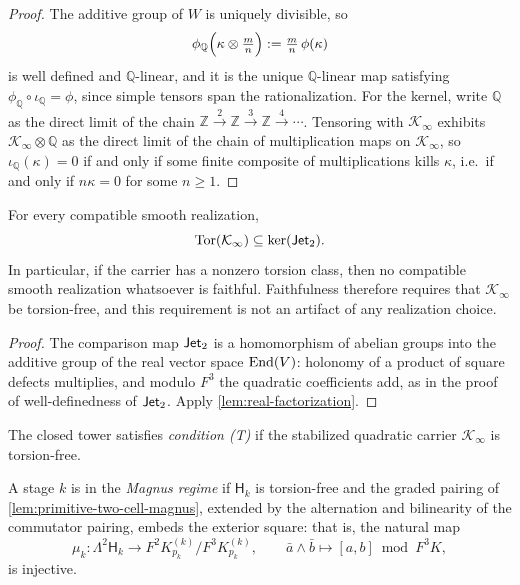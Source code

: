 \begin{proof}
	The additive group of \(W\) is uniquely divisible, so
	\[
		\phi_{\mathbb Q}\Bigl(\kappa\otimes\tfrac{m}{n}\Bigr)
		:=
		\tfrac{m}{n}\,\phi(\kappa)
	\]
	is well defined and \(\mathbb Q\)-linear, and it is the unique
	\(\mathbb Q\)-linear map satisfying
	\(\phi_{\mathbb Q}\circ\iota_{\mathbb Q}=\phi\), since simple tensors
	span the rationalization.
	For the kernel, write \(\mathbb Q\) as the direct limit of the chain
	\(\mathbb Z\xrightarrow{\,2\,}\mathbb Z\xrightarrow{\,3\,}\mathbb
	Z\xrightarrow{\,4\,}\cdots\).  Tensoring with \(\mathcal K_\infty\)
	exhibits \(\mathcal K_\infty\otimes\mathbb Q\) as the direct limit of
	the chain of multiplication maps on \(\mathcal K_\infty\), so
	\(\iota_{\mathbb Q}(\kappa)=0\) if and only if some finite composite
	of multiplications kills \(\kappa\), i.e.\ if and only if
	\(n\kappa=0\) for some \(n\ge1\).
\end{proof}
\begin{corollary}
	\label{cor:torsion-invisible}
	For every compatible smooth realization,
	\[
		\operatorname{Tor}(\mathcal K_\infty)\subseteq\ker(\mathsf{Jet}_2).
	\]
	In particular, if the carrier has a nonzero torsion class, then no
	compatible smooth realization whatsoever is faithful.  Faithfulness
	therefore requires that \(\mathcal K_\infty\) be torsion-free, and
	this requirement is not an artifact of any realization choice.
\end{corollary}
\begin{proof}
	The comparison map \(\mathsf{Jet}_2\) is a homomorphism of abelian groups into
	the additive group of the real vector space \(\mathrm{End}(V)\): holonomy of
	a product of square defects multiplies, and modulo \(F^3\) the
	quadratic coefficients add, as in the proof of well-definedness of
	\(\mathsf{Jet}_2\).  Apply \cref{lem:real-factorization}.
\end{proof}
\begin{definition}
	\label{def:condition-T}
	The closed tower satisfies \emph{condition \textup{(T)}} if the
	stabilized quadratic carrier \(\mathcal K_\infty\) is torsion-free.
\end{definition}
\begin{definition}
	\label{def:magnus-regime}
	A stage \(k\) is in the \emph{Magnus regime} if \(\mathsf H_k\) is
	torsion-free and the graded pairing of
	\cref{lem:primitive-two-cell-magnus}, extended by the alternation and
	bilinearity of the commutator pairing, embeds the exterior square:
	that is, the natural map
	\[
		\mu_k:\Lambda^2\mathsf H_k\longrightarrow
		F^2K_{p_k}^{(k)}/F^3K_{p_k}^{(k)},
		\qquad
		\bar a\wedge\bar b\longmapsto[a,b]\bmod F^3K,
	\]
	is injective.
\end{definition}
